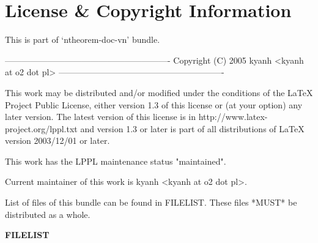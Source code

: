 \section*{License \& Copyright Information}

\vskip1cm

\begin{example}
 This is part of `ntheorem-doc-vn' bundle.

 ----------------------------------------------------------
 Copyright (C) 2005 kyanh <kyanh at o2 dot pl>
 ----------------------------------------------------------

 This work may be distributed and/or modified under the
 conditions of the LaTeX Project Public License, either version 1.3
 of this license or (at your option) any later version.
 The latest version of this license is in
	http://www.latex-project.org/lppl.txt
 and version 1.3 or later is part of all distributions of LaTeX
 version 2003/12/01 or later.

 This work has the LPPL maintenance status "maintained".

 Current maintainer of this work is kyanh <kyanh at o2 dot pl>.
 
 List of files of this bundle can be found in FILELIST.
 These files *MUST* be distributed as a whole.
\end{example}

\bigskip

\textbf{FILELIST}
{\small

}

\endinput
